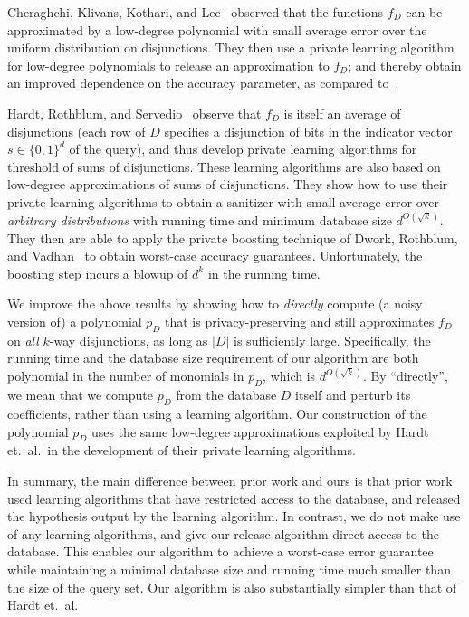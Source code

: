 \documentclass[11pt]{article}
\newcommand\bits{\{0,1\}}
\theoremstyle{definition}
\begin{document}
Cheraghchi, Klivans, Kothari, and Lee~\cite{CheraghchiKlKoLe12} observed that the functions $f_D$ can be approximated by a low-degree polynomial with small average error over the uniform distribution on disjunctions. They then use a private learning algorithm for low-degree polynomials to release an approximation to $f_D$; and thereby obtain an improved dependence on the accuracy parameter, as compared to~\cite{GuptaHaRoUl11}.  

Hardt, Rothblum, and Servedio~\cite{HardtRoSe12} observe that $f_D$ is itself an average of disjunctions (each row of $D$ specifies a disjunction of bits in the indicator vector $s \in \bits^d$ of the query), and thus develop private learning algorithms for threshold of sums of disjunctions.  These learning algorithms are also based on low-degree approximations of sums of disjunctions.
They show how to use their private learning algorithms to obtain a sanitizer with small average error over \emph{arbitrary distributions} with running time and minimum database size $d^{O(\sqrt{k})}$.  They then are able to apply the private boosting technique of Dwork, Rothblum, and Vadhan~\cite{DworkRoVa10} to obtain worst-case accuracy guarantees.  Unfortunately, the boosting step incurs a blowup of $d^{k}$ in the running time.

We improve the above results by showing how to \emph{directly} compute (a noisy version of) a polynomial $p_D$ that is privacy-preserving and still approximates $f_D$ on \emph{all} $k$-way disjunctions, as long as $|D|$ is sufficiently large. Specifically, the running time and the database size requirement of our algorithm are both polynomial in the number of monomials in $p_D$, which is $d^{O(\sqrt{k})}$.  By ``directly'', we mean that we compute $p_D$ from the database $D$ itself and perturb its coefficients, rather than using a learning algorithm. Our construction of the polynomial $p_D$ uses the same low-degree approximations exploited by Hardt et.~al.~in the development
of their private learning algorithms. 





In summary, the main difference between prior work and ours is that prior work used learning algorithms that have restricted access to the database, and released the hypothesis
output by the learning algorithm. In contrast, we do not make use of any learning algorithms, and give our release algorithm direct access to the database. This enables our algorithm to achieve a worst-case error guarantee while maintaining a minimal database size and running time much smaller than the size of the query set.  Our algorithm is also substantially simpler than that of Hardt et.~al.
\end{document}

